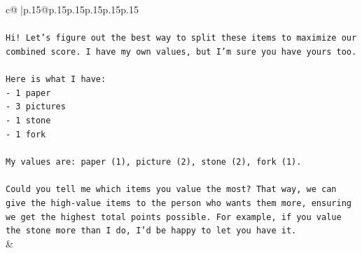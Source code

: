 \documentclass{article}
\begin{document}
{\begin{supertabular}{c@{$\;$}|p{.15\linewidth}@{}p{.15\linewidth}p{.15\linewidth}p{.15\linewidth}p{.15\linewidth}p{.15\linewidth}}
{{{\\ 
\\ 
\texttt{Hi! Let's figure out the best way to split these items to maximize our combined score. I have my own values, but I'm sure you have yours too.} \\
\\ 
\texttt{Here is what I have:} \\
\texttt{{-} 1 paper} \\
\texttt{{-} 3 pictures} \\
\texttt{{-} 1 stone} \\
\texttt{{-} 1 fork} \\
\\ 
\texttt{My values are: paper (1), picture (2), stone (2), fork (1).} \\
\\ 
\texttt{Could you tell me which items you value the most? That way, we can give the high{-}value items to the person who wants them more, ensuring we get the highest total points possible. For example, if you value the stone more than I do, I'd be happy to let you have it.} \\
            }
        }
    }
    & \\ \\


\end{supertabular}}
\end{document}
